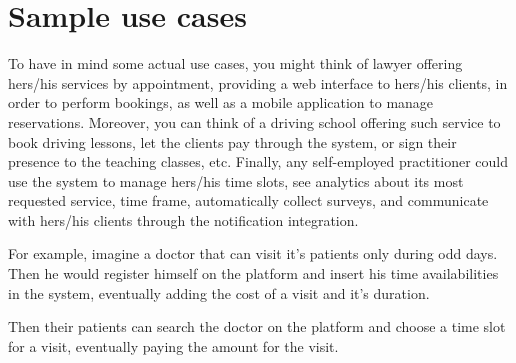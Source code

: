 \documentclass{article}
\begin{document}
\section{Sample use cases}

To have in mind some actual use cases, you might think of lawyer offering
hers/his services by appointment, providing a web interface to hers/his
clients, in order to perform bookings, as well as a mobile application to
manage reservations. Moreover, you can think of a driving school offering such
service to book driving lessons, let the clients pay through the system, or
sign their presence to the teaching classes, etc. Finally, any self-employed
practitioner could use the system to manage hers/his time slots, see analytics
about its most requested service, time frame, automatically collect surveys,
and communicate with hers/his clients through the notification integration.

For example, imagine a doctor that can visit it's patients only during odd
days. Then he would register himself on the platform and insert his time 
availabilities in the system, eventually adding the cost of a visit and it's
duration.

Then their patients can search the doctor on the platform and choose a time
slot for a visit, eventually paying the amount for the visit.

\end{document}
